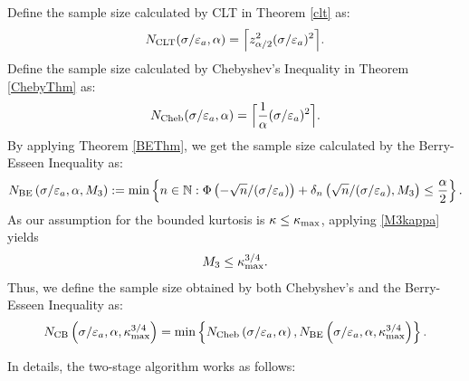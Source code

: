 \documentclass{iitthesis}
\theoremstyle{definition}
\begin{document}
Define the sample size calculated by CLT in Theorem \ref{clt} as:
\begin{equation}\label{NCLTmeanMCabsg}
N_{\text{CLT}}(\sigma/\varepsilon_a,\alpha)
= 
\Bigl\lceil
z_{\alpha/2}^2(\sigma/\varepsilon_a)^2
\Bigr\rceil.
\end{equation}
Define the sample size calculated by Chebyshev's Inequality in Theorem \ref{ChebyThm} as:
\begin{equation}\label{NChebymeanMCabsg}
N_{\text{Cheb}}(\sigma/\varepsilon_a,\alpha)
= 
\Bigl\lceil\frac{1}{\alpha}(\sigma/\varepsilon_a)^2\Bigr\rceil.
\end{equation}
By applying Theorem \ref{BEThm}, we get the sample size calculated by the Berry-Esseen Inequality as:
\begin{equation}\label{NBEmeanMCabsg}
N_{\text{BE}}\left(\sigma/\varepsilon_a,\alpha,M_3\right) := \min \left \{ n \in \mathbb{N} : \Phi\left(-\sqrt{n}/(\sigma/\varepsilon_a)\right)+\delta_n\left(\sqrt{n}/(\sigma/\varepsilon_a),M_3\right)
\le \frac{\alpha}{2} \right \}.
\end{equation}
As our assumption for the bounded kurtosis is $\kappa \leq \kappa_{\max}$, applying \eqref{M3kappa} yields 
\begin{align}\label{M3kmax}
M_3 \leq \kappa_{\max}^{3/4}.
\end{align}
Thus, we define the sample size obtained by both Chebyshev's and the Berry-Esseen Inequality as:
\begin{align}\label{NCBmeanMCabsg}
N_{\text{CB}} \left(\sigma/\varepsilon_a,\alpha, \kappa_{\max}^{3/4}\right)  = \min \left \{ N_{\text{Cheb}}\left(\sigma/\varepsilon_a,\alpha\right),N_{\text{BE}}\left(\sigma/\varepsilon_a,\alpha, \kappa_{\max}^{3/4}\right)\right \}.
\end{align}

 In details, the two-stage algorithm works as follows:
\end{document}

